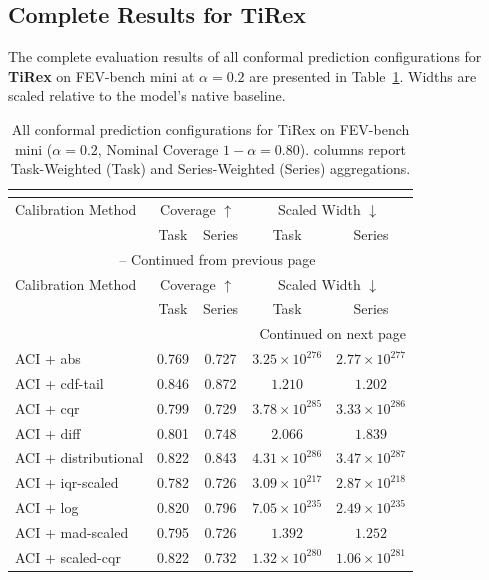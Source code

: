 \subsection{Complete Results for TiRex}
The complete evaluation results of all conformal prediction configurations for \textbf{TiRex} on FEV-bench mini at $\alpha=0.2$ are presented in Table~\ref{tab:all_results_tirex}. Widths are scaled relative to the model's native baseline.

\begin{longtable}{lcccc}
	\caption{All conformal prediction configurations for TiRex on FEV-bench mini ($\alpha=0.2$, Nominal Coverage $1-\alpha=0.80$). columns report Task-Weighted (Task) and Series-Weighted (Series) aggregations.}\\
	\label{tab:all_results_tirex}\\
	\hline
	Calibration Method & \multicolumn{2}{c}{Coverage $\uparrow$} & \multicolumn{2}{c}{Scaled Width $\downarrow$} \\
 & Task & Series & Task & Series \\
	\hline
	\endfirsthead
	\multicolumn{5}{c}{\tablename\ \thetable\ -- Continued from previous page} \\
	\hline
	Calibration Method & \multicolumn{2}{c}{Coverage $\uparrow$} & \multicolumn{2}{c}{Scaled Width $\downarrow$} \\
 & Task & Series & Task & Series \\
	\hline
	\endhead
	\hline \multicolumn{5}{r}{{Continued on next page}} \\
	\endfoot
	\hline
	\endlastfoot
	ACI + abs & 0.769 & 0.727 & $3.25 \times 10^{276}$ & $2.77 \times 10^{277}$ \\
	ACI + cdf-tail & 0.846 & 0.872 & $1.210$ & $1.202$ \\
	ACI + cqr & 0.799 & 0.729 & $3.78 \times 10^{285}$ & $3.33 \times 10^{286}$ \\
	ACI + diff & 0.801 & 0.748 & $2.066$ & $1.839$ \\
	ACI + distributional & 0.822 & 0.843 & $4.31 \times 10^{286}$ & $3.47 \times 10^{287}$ \\
	ACI + iqr-scaled & 0.782 & 0.726 & $3.09 \times 10^{217}$ & $2.87 \times 10^{218}$ \\
	ACI + log & 0.820 & 0.796 & $7.05 \times 10^{235}$ & $2.49 \times 10^{235}$ \\
	ACI + mad-scaled & 0.795 & 0.726 & $1.392$ & $1.252$ \\
	ACI + scaled-cqr & 0.822 & 0.732 & $1.32 \times 10^{280}$ & $1.06 \times 10^{281}$ \\

\end{longtable}
